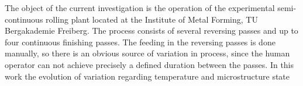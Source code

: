 The object of the current investigation is the operation of the experimental semi-continuous rolling plant located at the Institute of Metal Forming, TU Bergakademie Freiberg.
The process consists of several reversing passes and up to four continuous finishing passes.
The feeding in the reversing passes is done manually, so there is an obvious source of variation in process, since the human operator can not achieve precisely a defined duration between the passes.
In this work the evolution of variation regarding temperature and microstructure state


